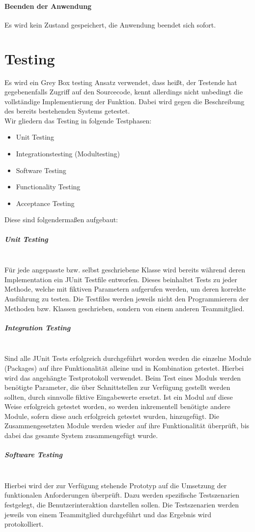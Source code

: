 \documentclass[10pt,a4paper]{article}
\begin{document}
\paragraph{Beenden der Anwendung}
Es wird kein Zustand gespeichert, die Anwendung beendet sich sofort.
\newpage
\section{Testing}
Es wird ein Grey Box testing Ansatz verwendet, dass heißt, der Testende hat gegebenenfalls Zugriff auf den Sourcecode, kennt allerdings nicht unbedingt die vollständige Implementierung der Funktion. Dabei wird gegen die Beschreibung des bereits bestehenden Systems getestet.\\
Wir gliedern das Testing in folgende Testphasen:
\begin{itemize}
\item Unit Testing
\item Integrationstesting (Modultesting)
\item Software Testing
\item Functionality Testing
\item Acceptance Testing
\end{itemize}
Diese sind folgendermaßen aufgebaut:
\subparagraph{Unit Testing}\ \\
Für jede angepasste bzw. selbst geschriebene Klasse wird bereits während deren Implementation ein JUnit Testfile entworfen. Dieses beinhaltet Tests zu jeder Methode, welche mit fiktiven Parametern aufgerufen werden, um deren korrekte Ausführung zu testen. Die Testfiles werden jeweils nicht den Programmierern der Methoden bzw. Klassen geschrieben, sondern von einem anderen Teammitglied. 

\subparagraph{Integration Testing}\ \\
Sind alle JUnit Tests erfolgreich durchgeführt worden werden die einzelne Module (Packages) auf ihre Funktionalität alleine und in Kombination getestet. Hierbei wird das angehängte Testprotokoll verwendet. Beim Test eines Moduls werden benötigte Parameter, die über Schnittstellen zur Verfügung gestellt werden sollten, durch sinnvolle fiktive Eingabewerte ersetzt. Ist ein Modul auf diese Weise erfolgreich getestet worden, so werden inkrementell benötigte andere Module, sofern diese auch erfolgreich getestet wurden, hinzugefügt. Die Zusammengesetzten Module werden wieder auf ihre Funktionalität überprüft, bis dabei das gesamte System zusammengefügt wurde.

\subparagraph{Software Testing}\ \\
Hierbei wird der zur Verfügung stehende Prototyp auf die Umsetzung der funktionalen Anforderungen überprüft. Dazu werden spezifische Testszenarien festgelegt, die Benutzerinteraktion darstellen sollen. Die Testszenarien werden jeweils von einem Teammitglied durchgeführt und das Ergebnis wird protokolliert. 
\end{document}
